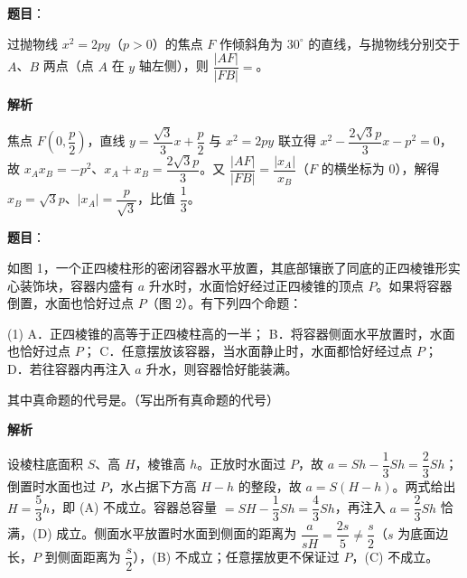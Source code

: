 \begin{answer}

\textbf{题目}：

过抛物线 $x^2=2py$（$p>0$）的焦点 $F$ 作倾斜角为 $30^\circ$ 的直线，与抛物线分别交于 $A$、$B$ 两点（点 $A$ 在 $y$ 轴左侧），则 $\dfrac{|AF|}{|FB|}=$\gkblank{}。

\textbf{解析}

焦点 $F\left(0,\dfrac p2\right)$，直线 $y=\dfrac{\sqrt3}3x+\dfrac p2$ 与 $x^2=2py$ 联立得 $x^2-\dfrac{2\sqrt3p}3x-p^2=0$，故 $x_Ax_B=-p^2$、$x_A+x_B=\dfrac{2\sqrt3p}3$。又 $\dfrac{|AF|}{|FB|}=\dfrac{|x_A|}{x_B}$（$F$ 的横坐标为 $0$），解得 $x_B=\sqrt3p$、$|x_A|=\dfrac p{\sqrt3}$，比值 $\dfrac13$。


\end{answer}
\begin{answer}

\textbf{题目}：

如图 1，一个正四棱柱形的密闭容器水平放置，其底部镶嵌了同底的正四棱锥形实心装饰块，容器内盛有 $a$ 升水时，水面恰好经过正四棱锥的顶点 $P$。如果将容器倒置，水面也恰好过点 $P$（图 2）。有下列四个命题：

\begin{gkopts}(1)
\task A．正四棱锥的高等于正四棱柱高的一半；
\task B．将容器侧面水平放置时，水面也恰好过点 $P$；
\task C．任意摆放该容器，当水面静止时，水面都恰好经过点 $P$；
\task D．若往容器内再注入 $a$ 升水，则容器恰好能装满。
\end{gkopts}

其中真命题的代号是\gkblank{}。（写出所有真命题的代号）
\nopagebreak[4]
\begin{center}\end{center}
\nopagebreak[4]
\textbf{解析}

设棱柱底面积 $S$、高 $H$，棱锥高 $h$。正放时水面过 $P$，故 $a=Sh-\dfrac13Sh=\dfrac23Sh$；倒置时水面也过 $P$，水占据下方高 $H-h$ 的整段，故 $a=S(H-h)$。两式给出 $H=\dfrac53h$，即 (A) 不成立。容器总容量 $=SH-\dfrac13Sh=\dfrac43Sh$，再注入 $a=\dfrac23Sh$ 恰满，(D) 成立。侧面水平放置时水面到侧面的距离为 $\dfrac a{sH}=\dfrac{2s}5\ne\dfrac s2$（$s$ 为底面边长，$P$ 到侧面距离为 $\dfrac s2$），(B) 不成立；任意摆放更不保证过 $P$，(C) 不成立。


\end{answer}
